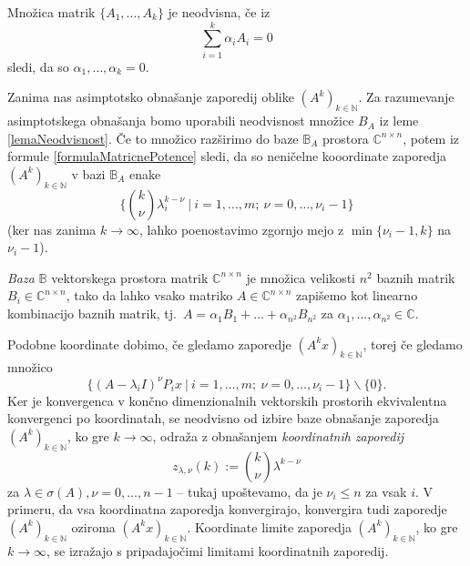 \documentclass[mat1]{fmfdelo}
\newcommand{\N}{\mathbb N}
\newcommand{\C}{\mathbb C}
\begin{document}
\begin{opomba}
    Množica matrik $\{A_1, \ldots, A_k\}$ je neodvisna, če iz
    \begin{equation*}
        \sum_{i=1}^k \alpha_i A_i = 0
    \end{equation*}
    sledi, da so $\alpha_1, \ldots, \alpha_k = 0$.
\end{opomba}
Zanima nas asimptotsko obnašanje zaporedij oblike $(A^k)_{k\in\N}$. Za razumevanje asimptotskega obnašanja bomo uporabili neodvisnost množice $B_A$ iz leme \ref{lemaNeodvisnost}. Če to množico razširimo do baze $\mathbb{B}_A$ prostora $\C^{n \times n}$, potem iz formule \eqref{formulaMatricnePotence} sledi, da so neničelne kooordinate zaporedja $(A^k)_{k\in\N}$ v bazi $\mathbb{B}_A$ enake
\begin{equation*}
    \Big\{{k \choose \nu} \lambda_i^{k-\nu}\ |\ i = 1, \ldots, m;\ \nu = 0, \ldots, \nu_i-1\Big\}
\end{equation*}
(ker nas zanima $k \rightarrow \infty$, lahko poenostavimo zgornjo mejo z $\min\{\nu_i-1, k\}$ na $\nu_i - 1$).
\begin{opomba}
    \emph{Baza} $\mathbb{B}$ vektorskega prostora matrik $\C^{n\times n}$ je množica velikosti $n^2$ baznih matrik $B_i \in \C^{n\times n}$, tako da lahko vsako matriko $A \in \C^{n\times n}$ zapišemo kot linearno kombinacijo baznih matrik, tj.\ $A = \alpha_1 B_1 + \ldots + \alpha_{n^2} B_{n^2}$ za $\alpha_1, \ldots, \alpha_{n^2} \in \C$.
\end{opomba}
Podobne koordinate dobimo, če gledamo zaporedje $(A^k x)_{k\in\N}$, torej če gledamo množico
\begin{equation*}
    \{(A-\lambda_i I)^{\nu} P_i x\ |\ i = 1, \ldots, m;\ \nu = 0, \ldots, \nu_i - 1\} \backslash \{0\}.
\end{equation*}
Ker je konvergenca v končno dimenzionalnih vektorskih prostorih ekvivalentna konvergenci po koordinatah, se neodvisno od izbire baze obnašanje zaporedja $(A^k)_{k\in\N}$, ko gre $k \rightarrow \infty$, odraža z obnašanjem \emph{koordinatnih zaporedij}
\begin{equation*}
    z_{\lambda, \nu} (k) := {k \choose \nu} \lambda^{k - \nu}
\end{equation*}
za $\lambda \in \sigma(A), \nu = 0, \ldots, n-1$ -- tukaj upoštevamo, da je $\nu_i \leq n$ za vsak $i$. V primeru, da vsa koordinatna zaporedja konvergirajo, konvergira tudi zaporedje $(A^k)_{k\in\N}$ oziroma $(A^k x)_{k\in\N}$. Koordinate limite zaporedja $(A^k)_{k\in\N}$, ko gre $k \rightarrow \infty$, se izražajo s pripadajočimi limitami koordinatnih zaporedij.
\end{document}
